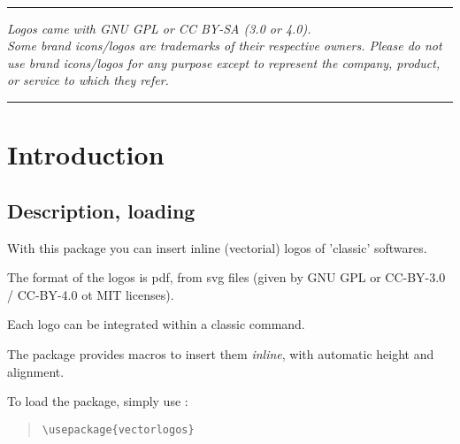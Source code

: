 \documentclass[11pt,a4paper]{ltxdoc}
\begin{document}
\vfill~

\hrule

\medskip

\emph{%
Logos came with GNU GPL or CC BY-SA (3.0 or 4.0).\\
Some brand icons/logos are trademarks of their respective owners. Please do not use brand icons/logos for any purpose except to represent the company, product, or service to which they refer.%
}

\medskip

\hrule

\vspace*{5mm}

\pagebreak


\hypertarget{matoc}{}

\tableofcontents

\vspace*{5mm}


\pagebreak

\section{Introduction}

\subsection{Description, loading}

With this package you can insert inline (vectorial) logos of 'classic' softwares.

The format of the logos is \textsf{pdf}, from \textsf{svg} files (given by \textsf{GNU GPL} or \textsf{CC-BY-3.0 / CC-BY-4.0} ot \textsf{MIT} licenses).

\medskip

Each logo can be integrated within a classic  command.

The package provides macros to insert them \textit{inline}, with automatic height and alignment.

\medskip

To load the package, simply use :

\begin{quote}
\begin{verbatim}
\usepackage{vectorlogos}
\end{verbatim}
\end{quote}
\end{document}
